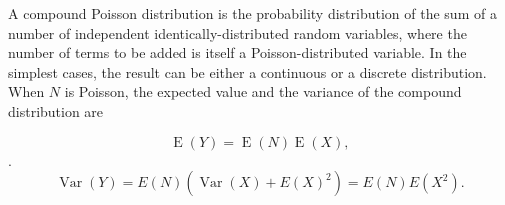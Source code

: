 
	\begin{framed}
		\noindent A compound Poisson distribution is the probability distribution of the sum of a number of independent identically-distributed random variables, where the number of terms to be added is itself a Poisson-distributed variable. In the simplest cases, the result can be either a continuous or a discrete distribution. \\
		
		\noindent When $N$ is Poisson, the expected value and the variance of the compound distribution are
		
		\[ {\displaystyle \operatorname {E} (Y)=\operatorname {E} (N)\operatorname {E} (X),} \] . \[{\displaystyle \operatorname {Var} (Y)=E(N)(\operatorname {Var} (X)+{E(X)}^{2})=E(N){E(X^{2})}.} \]
		
	\end{framed}
	